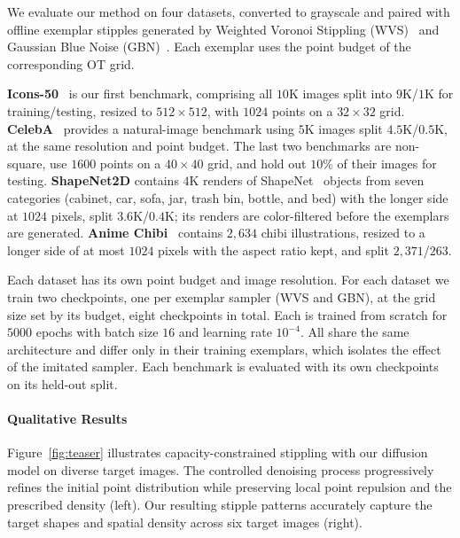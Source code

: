 \documentclass{egpubl}
\begin{document}
We evaluate our method on four datasets, converted to grayscale and paired with offline exemplar stipples generated by Weighted Voronoi Stippling (WVS)~\cite{10.1145/508530.508537} and Gaussian Blue Noise (GBN)~\cite{Ahmed2022Gaussian}. Each exemplar uses the point budget of the corresponding OT grid.

\textbf{Icons-50}~\cite{hendrycks2018icons50} is our first benchmark, comprising all $10$K images split into $9$K/$1$K for training/testing, resized to $512\times512$, with $1024$ points on a $32\times32$ grid. \textbf{CelebA}~\cite{liu2015celeba} provides a natural-image benchmark using $5$K images split $4.5$K/$0.5$K, at the same resolution and point budget. The last two benchmarks are non-square, use $1600$ points on a $40\times40$ grid, and hold out $10\%$ of their images for testing. \textbf{ShapeNet2D} contains $4$K renders of ShapeNet~\cite{chang2015shapenetinformationrich3dmodel} objects from seven categories (cabinet, car, sofa, jar, trash bin, bottle, and bed) with the longer side at $1024$ pixels, split $3.6$K/$0.4$K; its renders are color-filtered before the exemplars are generated. \textbf{Anime Chibi}~\cite{AnimeChibiKaggle} contains $2{,}634$ chibi illustrations, resized to a longer side of at most $1024$ pixels with the aspect ratio kept, and split $2{,}371$/$263$.


Each dataset has its own point budget and image resolution. For each dataset we train two checkpoints, one per exemplar sampler (WVS and GBN), at the grid size set by its budget, eight checkpoints in total. Each is trained from scratch for $5000$ epochs with batch size $16$ and learning rate $10^{-4}$. All share the same architecture and differ only in their training exemplars, which isolates the effect of the imitated sampler. Each benchmark is evaluated with its own checkpoints on its held-out split.




\paragraph{Qualitative Results}

Figure~\ref{fig:teaser} illustrates capacity-constrained stippling with our diffusion model on diverse target images. The controlled denoising process progressively refines the initial point distribution while preserving local point repulsion and the prescribed density (left). Our resulting stipple patterns accurately capture the target shapes and spatial density across six target images (right).
\end{document}
